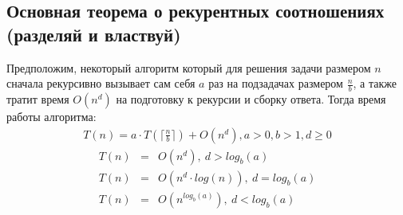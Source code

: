 \documentclass[a4paper,12pt]{article}
\begin{document}
	
	\subsection{Основная теорема о рекурентных соотношениях (разделяй и властвуй)}
	Предположим, некоторый алгоритм который для решения задачи размером $n$ сначала рекурсивно вызывает сам себя $a$ раз на подзадачах размером $\frac{n}{b}$, а также тратит время $O(n^d)$ на подготовку к рекурсии и сборку ответа. Тогда время работы алгоритма:
	\begin{eqnarray}
		T(n) = a\cdot T(\lceil \frac{n}{b} \rceil) + O(n^d), a > 0, b > 1, d \geq 0
	\end{eqnarray}
	\begin{eqnarray}
		T(n) & = & O(n^d),~ d > log_b(a) \\
		T(n) & = & O(n^d \cdot log(n)),~ d = log_b(a) \\
		T(n) & = & O(n^{log_b(a)}), ~ d < log_b(a)
	\end{eqnarray}
\end{document}
